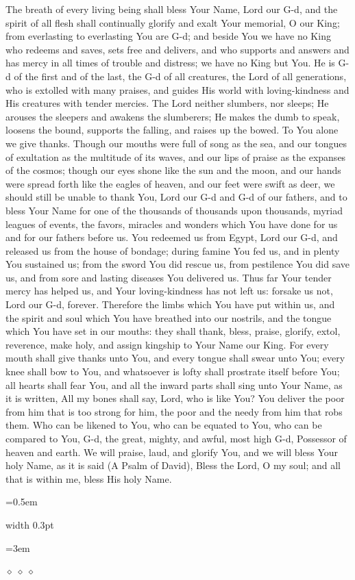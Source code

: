 \documentclass[11pt, openany]{book}
\newlength{\bidiHebWidth}
\newlength{\bidiEngWidth}
\newenvironment{bilingual}{%
  \par\vspace{4pt}%
}{%
  \noindent
  \begin{minipage}[t]{\bidiEngWidth}
    \setstretch{1.4}\emergencystretch=0.5em\normalsize
    \usebox{\bidiEngBox}
  \end{minipage}%
  \hfill
  {\color{sedergold}\vrule width 0.3pt}%
  \hfill
  \begin{minipage}[t]{\bidiHebWidth}
    \begingroup\hebrewfont\TeXXeTstate=1\beginR
    \large\setstretch{1.4}\emergencystretch=3em\tolerance=9999\parindent=0pt\relax
    \usebox{\bidiHebBox}
    \endR\endgroup
  \end{minipage}%
  \par\vspace{2pt}%
}
\newenvironment{englishcol}{%
  \begin{lrbox}{\bidiEngBox}\begin{minipage}{\bidiEngWidth}%
}{%
  \end{minipage}\end{lrbox}%
}
\newcommand{\parasep}{%
  \par\vspace{3pt}
  \begin{center}
    \textcolor{sedergold!50}{\tiny$\diamond\;\diamond\;\diamond$}
  \end{center}
  \par\vspace{3pt}
}
\begin{document}
\begin{bilingual}
\begin{englishcol}
The breath of every living being shall bless Your Name, Lord our G-d, and the spirit of all flesh shall continually glorify and exalt Your memorial, O our King; from everlasting to everlasting You are G-d; and beside You we have no King who redeems and saves, sets free and delivers, and who supports and answers and has mercy in all times of trouble and distress; we have no King but You. He is G-d of the first and of the last, the G-d of all creatures, the Lord of all generations, who is extolled with many praises, and guides His world with loving-kindness and His creatures with tender mercies. The Lord neither slumbers, nor sleeps; He arouses the sleepers and awakens the slumberers; He makes the dumb to speak, loosens the bound, supports the falling, and raises up the bowed. To You alone we give thanks. Though our mouths were full of song as the sea, and our tongues of exultation as the multitude of its waves, and our lips of praise as the expanses of the cosmos; though our eyes shone like the sun and the moon, and our hands were spread forth like the eagles of heaven, and our feet were swift as deer, we should still be unable to thank You, Lord our G-d and G-d of our fathers, and to bless Your Name for one of the thousands of thousands upon thousands, myriad leagues of events, the favors, miracles and wonders which You have done for us and for our fathers before us. You redeemed us from Egypt, Lord our G-d, and released us from the house of bondage; during famine You fed us, and in plenty You sustained us; from the sword You did rescue us, from pestilence You did save us, and from sore and lasting diseases You delivered us. Thus far Your tender mercy has helped us, and Your loving-kindness has not left us: forsake us not, Lord our G-d, forever. Therefore the limbs which You have put within us, and the spirit and soul which You have breathed into our nostrils, and the tongue which You have set in our mouths: they shall thank, bless, praise, glorify, extol, reverence, make holy, and assign kingship to Your Name our King. For every mouth shall give thanks unto You, and every tongue shall swear unto You; every knee shall bow to You, and whatsoever is lofty shall prostrate itself before You; all hearts shall fear You, and all the inward parts shall sing unto Your Name, as it is written, All my bones shall say, Lord, who is like You? You deliver the poor from him that is too strong for him, the poor and the needy from him that robs them. Who can be likened to You, who can be equated to You, who can be compared to You, G-d, the great, mighty, and awful, most high G-d, Possessor of heaven and earth. We will praise, laud, and glorify You, and we will bless Your holy Name, as it is said (A Psalm of David), Bless the Lord, O my soul; and all that is within me, bless His holy Name.
\end{englishcol}
\end{bilingual}
\parasep
\end{document}
